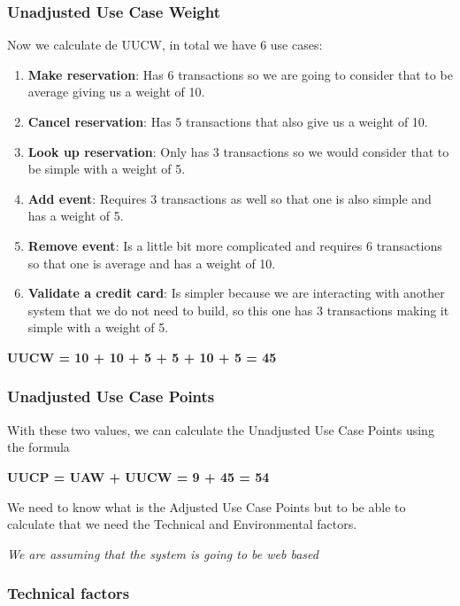 \subsubsection{Unadjusted Use Case Weight}
\noindent
Now we calculate de UUCW, in total we have 6 use cases:
\begin{enumerate}
    \item \textbf{Make reservation}: Has 6 transactions so we are going to consider that to be average giving us a weight of 10.
    \item \textbf{Cancel reservation}: Has 5 transactions that also give us a weight of 10.
    \item \textbf{Look up reservation}: Only has 3 transactions so we would consider that to be simple with a weight of 5.
    \item \textbf{Add event}: Requires 3 transactions as well so that one is also simple and has a weight of 5.
    \item \textbf{Remove event}: Is a little bit more complicated and requires 6 transactions so that one is average and has a weight of 10.
    \item \textbf{Validate a credit card}: Is simpler because we are interacting with another system that we do not need to build, so this one has 3 transactions making it simple with a weight of 5.
\end{enumerate}

\noindent
\textbf{UUCW = 10 + 10 + 5 + 5 + 10 + 5 = 45} \newline

\subsubsection{Unadjusted Use Case Points}
\noindent
With these two values, we can calculate the Unadjusted Use Case Points using the formula
\newline

\noindent
\textbf{UUCP = UAW + UUCW = 9 + 45 = 54}\newline

\noindent
We need to know what is the Adjusted Use Case Points but to be able to calculate that we need the Technical and Environmental factors.\newline

\noindent
\textit{We are assuming that the system is going to be web based} \newline\newline
\pagebreak

\subsubsection{Technical factors}

